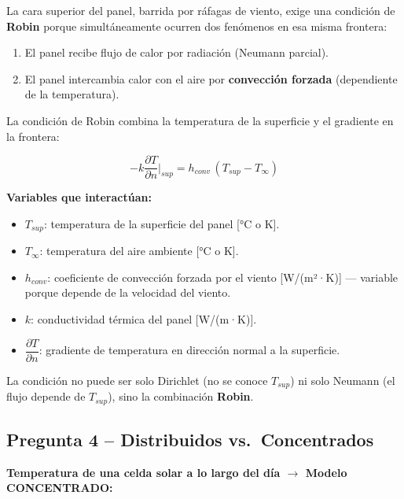 \documentclass[12pt,a4paper]{article}
\begin{document}
\noindent La cara superior del panel, barrida por ráfagas de viento, exige una condición de
\textbf{Robin} porque simultáneamente ocurren dos fenómenos en esa misma frontera:

\begin{enumerate}
    \item El panel recibe flujo de calor por radiación (Neumann parcial).
    \item El panel intercambia calor con el aire por \textbf{convección forzada} (dependiente de
          la temperatura).
\end{enumerate}

\noindent La condición de Robin combina la temperatura de la superficie y el gradiente en la
frontera:

\begin{equation}
    -k\frac{\partial T}{\partial n}\bigg|_{sup} = h_{conv}\,(T_{sup} - T_{\infty})
\end{equation}

\noindent\textbf{Variables que interactúan:}
\begin{itemize}
    \item $T_{sup}$: temperatura de la superficie del panel [°C o K].
    \item $T_{\infty}$: temperatura del aire ambiente [°C o K].
    \item $h_{conv}$: coeficiente de convección forzada por el viento [W/(m²·K)] --- variable
          porque depende de la velocidad del viento.
    \item $k$: conductividad térmica del panel [W/(m·K)].
    \item $\dfrac{\partial T}{\partial n}$: gradiente de temperatura en dirección normal a la
          superficie.
\end{itemize}

\noindent La condición no puede ser solo Dirichlet (no se conoce $T_{sup}$) ni solo Neumann (el
flujo depende de $T_{sup}$), sino la combinación \textbf{Robin}.

\subsection*{Pregunta 4 -- Distribuidos vs.\ Concentrados}

\noindent\textbf{Temperatura de una celda solar a lo largo del día $\rightarrow$ Modelo
CONCENTRADO:}
\end{document}
